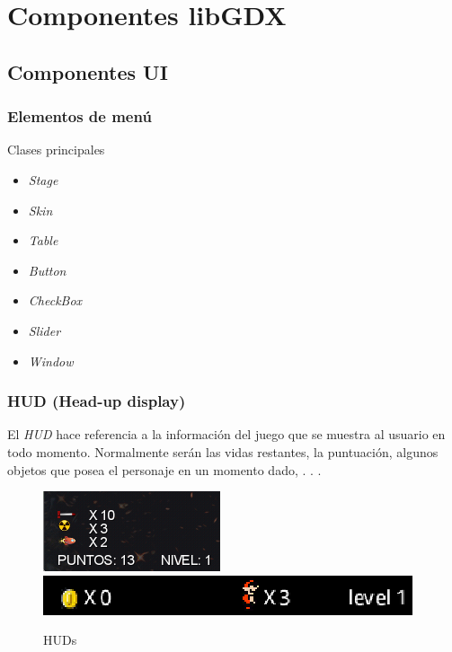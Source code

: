 \documentclass[xcolor={dvipsnames}]{beamer}
\begin{document}
\section{Componentes libGDX}
\subsection{Componentes UI}
\begin{frame}\frametitle{Elementos de menú}
	\begin{block}{Clases principales}
    \begin{itemize}
        \item \emph{\textcolor{resalta}{Stage}}
        \item \emph{\textcolor{resalta}{Skin}}
		\item \emph{\textcolor{resalta}{Table}} 
		\item \emph{\textcolor{resalta}{Button}} 
		\item \emph{\textcolor{resalta}{CheckBox}} 
		\item \emph{\textcolor{resalta}{Slider}} 
		\item \emph{\textcolor{resalta}{Window}} 
    \end{itemize}
    \end{block}
\end{frame}

\begin{frame}\frametitle{HUD (Head-up display)}
    El \emph{HUD} hace referencia a la información del juego que se muestra al usuario en todo momento. Normalmente serán las vidas
    restantes, la puntuación, algunos objetos que posea el personaje en un momento dado, . . .

    \begin{figure}
    \includegraphics[scale=0.55]{images/hud2}
    \hspace{0.5cm}
    \includegraphics[scale=0.35]{images/hud1} 
    \caption{HUDs}
    \end{figure}
\end{frame}
\end{document}
